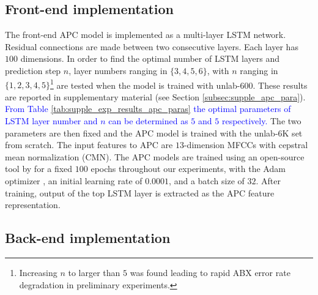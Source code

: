 \documentclass[transmag]{IEEEtran}
\begin{document}
\subsection{Front-end implementation}
The front-end APC model is implemented as a multi-layer LSTM network. Residual connections are made between two consecutive layers. Each layer has $100$ dimensions. 
In order to find the optimal number  of LSTM layers and prediction step $n$, layer numbers ranging in $\{3,4,5,6\}$, with   $n$ ranging in $\{1,2,3,4,5\}$\footnote{Increasing $n$ to larger than $5$ was found leading to rapid ABX error rate degradation in preliminary experiments.} are  tested when the model is trained with unlab-600. These results are reported in supplementary material (see Section \ref{subsec:supple_apc_para}).
\textcolor{blue}{From Table \ref{tab:supple_exp_results_apc_paras} the optimal parameters of LSTM layer number and $n$ can be determined as $5$ and $5$ respectively.}
The two parameters are then fixed and the APC  model is  trained with the unlab-6K set from scratch. The input features to APC are $13$-dimension MFCCs with cepstral mean normalization (CMN). The APC models are trained using an open-source tool by \cite{Chung2019} for a fixed $100$ epochs throughout our experiments, with the Adam optimizer \cite{kingma2014adam}, an initial learning rate of $0.0001$, and a batch size of $32$. After training, output of the top LSTM layer is extracted as the APC feature representation. %

\subsection{Back-end implementation}
\end{document}
